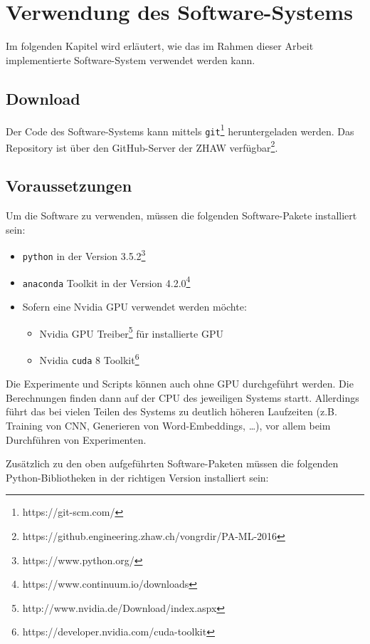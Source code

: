 \chapter{Verwendung des Software-Systems}
Im folgenden Kapitel wird erläutert, wie das im Rahmen dieser Arbeit implementierte Software-System verwendet werden kann.

\section{Download}
Der Code des Software-Systems kann mittels \texttt{git}\footnote{https://git-scm.com/} heruntergeladen werden. Das Repository ist über den GitHub-Server der ZHAW verfügbar\footnote{https://github.engineering.zhaw.ch/vongrdir/PA-ML-2016}.

\section{Voraussetzungen}
Um die Software zu verwenden, müssen die folgenden Software-Pakete installiert sein:

\begin{itemize}[noitemsep]
  \item \texttt{python} in der Version 3.5.2\footnote{https://www.python.org/}
  \item \texttt{anaconda} Toolkit in der Version 4.2.0\footnote{https://www.continuum.io/downloads}
  \item Sofern eine Nvidia GPU verwendet werden möchte:
    \begin{itemize}[noitemsep]
      \item Nvidia GPU Treiber\footnote{http://www.nvidia.de/Download/index.aspx} für installierte GPU
      \item Nvidia \texttt{cuda} 8 Toolkit\footnote{https://developer.nvidia.com/cuda-toolkit}
    \end{itemize}
\end{itemize}

Die Experimente und Scripts können auch ohne GPU durchgeführt werden. Die Berechnungen finden dann auf der CPU des jeweiligen Systems startt. Allerdings führt das bei vielen Teilen des Systems zu deutlich höheren Laufzeiten (z.B. Training von CNN, Generieren von Word-Embeddings, \dots), vor allem beim Durchführen von Experimenten.

Zusätzlich zu den oben aufgeführten Software-Paketen müssen die folgenden Python-Bibliotheken in der richtigen Version installiert sein:

